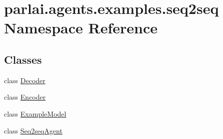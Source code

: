 \hypertarget{namespaceparlai_1_1agents_1_1examples_1_1seq2seq}{}\section{parlai.\+agents.\+examples.\+seq2seq Namespace Reference}
\label{namespaceparlai_1_1agents_1_1examples_1_1seq2seq}
\subsection*{Classes}
\begin{DoxyCompactItemize}
\item 
class \hyperlink{classparlai_1_1agents_1_1examples_1_1seq2seq_1_1Decoder}{Decoder}
\item 
class \hyperlink{classparlai_1_1agents_1_1examples_1_1seq2seq_1_1Encoder}{Encoder}
\item 
class \hyperlink{classparlai_1_1agents_1_1examples_1_1seq2seq_1_1ExampleModel}{Example\+Model}
\item 
class \hyperlink{classparlai_1_1agents_1_1examples_1_1seq2seq_1_1Seq2seqAgent}{Seq2seq\+Agent}
\end{DoxyCompactItemize}
